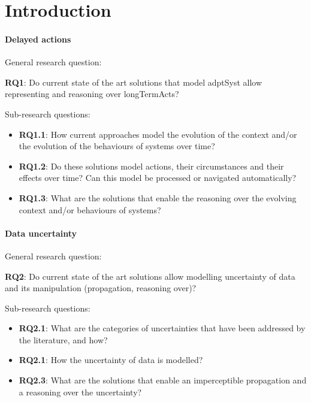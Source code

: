 \section{Introduction}

\paragraph{Delayed actions}
General research question:
\begin{center}
	\textbf{RQ1}: Do current state of the art solutions that model \gls{adptSyst} allow representing and reasoning over \glspl{longTermAct}?  
\end{center}

Sub-research questions:
\begin{itemize}
	\item \textbf{RQ1.1}: How current approaches model the evolution of the context and/or the evolution of the behaviours of systems over time?
	\item \textbf{RQ1.2}: Do these solutions model actions, their circumstances and their effects over time? Can this model be processed or navigated automatically?
	\item \textbf{RQ1.3}: What are the solutions that enable the reasoning over the evolving context and/or behaviours of systems?
\end{itemize}


\paragraph{Data uncertainty}
General research question:
\begin{center}
	\textbf{RQ2}: Do current state of the art solutions allow modelling uncertainty of data and its manipulation (propagation, reasoning over)? 
\end{center}

Sub-research questions:
\begin{itemize}
	\item \textbf{RQ2.1}: What are the categories of uncertainties that have been addressed by the literature, and how?
	\item \textbf{RQ2.1}: How the uncertainty of data is modelled?
	\item \textbf{RQ2.3}: What are the solutions that enable an imperceptible propagation and a reasoning over the uncertainty?
\end{itemize}

